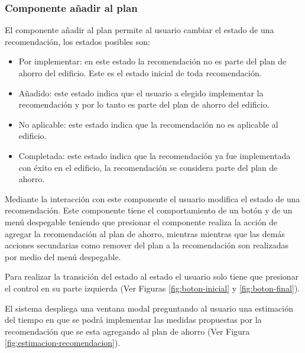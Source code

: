 \subsubsection{Componente añadir al plan}

El componente añadir al plan permite al usuario cambiar el estado
de una recomendación, los estados posibles son:

\begin{itemize}
\item Por implementar: en este estado la recomendación no es parte
  del plan de ahorro del edificio. Este es el estado inicial de toda
  recomendación.
\item Añadido: este estado indica que el usuario a elegido implementar la
  recomendación y por lo tanto es parte del plan de ahorro del edificio.
\item No aplicable: este estado indica que la recomendación no es aplicable al
  edificio.
\item Completada: este estado indica que la recomendación ya fue implementada
  con éxito en el edificio, la recomendación se considera parte del
  plan de ahorro.
\end{itemize}

Mediante la interacción con este componente el usuario modifica el estado
de una recomendación. Este componente tiene el comportamiento de un botón y
de un menú despegable teniendo que presionar el componente realiza la
acción de agregar la recomendación al plan de ahorro, mientras mientras que
las demás acciones secundarias como remover del plan a la recomendación
son realizadas por medio del menú despegable.

Para realizar la transición del estado  al estado
 el usuario solo tiene que presionar el control en su parte
izquierda (Ver Figuras \ref{fig:boton-inicial} y \ref{fig:boton-final}).

El sistema despliega una ventana modal preguntando al usuario una estimación
del tiempo en que se podrá implementar las medidas propuestas por la
recomendación que se esta agregando al plan de ahorro (Ver Figura \ref{fig:estimacion-recomendacion}).

